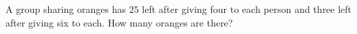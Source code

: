 A group sharing oranges has $25$ left after giving four to each person and three left after giving six to each. How many oranges are there?
